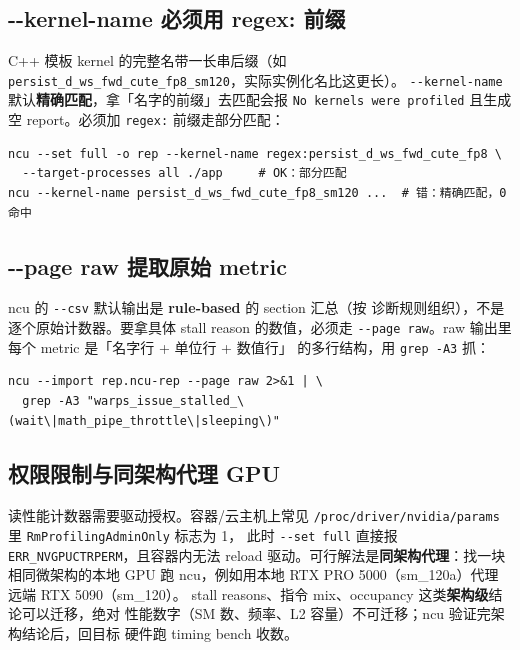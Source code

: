 \subsection{-{}-kernel-name 必须用 regex: 前缀}

C++ 模板 kernel 的完整名带一长串后缀（如
\texttt{persist\_\allowbreak{}d\_\allowbreak{}ws\_\allowbreak{}fwd\_\allowbreak{}cute\_\allowbreak{}fp8\_\allowbreak{}sm120}，实际实例化名比这更长）。
\texttt{-{}-kernel-name} 默认\textbf{精确匹配}，拿「名字的前缀」去匹配会报
\texttt{No kernels were profiled} 且生成空 report。必须加 \texttt{regex:}
前缀走部分匹配：

\begin{lstlisting}[style=console, title={kernel 名过滤：regex 前缀}]
ncu --set full -o rep --kernel-name regex:persist_d_ws_fwd_cute_fp8 \
  --target-processes all ./app     # OK：部分匹配
ncu --kernel-name persist_d_ws_fwd_cute_fp8_sm120 ...  # 错：精确匹配，0 命中
\end{lstlisting}

\subsection{-{}-page raw 提取原始 metric}

ncu 的 \texttt{-{}-csv} 默认输出是 \textbf{rule-based} 的 section 汇总（按
诊断规则组织），不是逐个原始计数器。要拿具体 stall reason 的数值，必须走
\texttt{-{}-page raw}。raw 输出里每个 metric 是「名字行 + 单位行 + 数值行」
的多行结构，用 \texttt{grep -A3} 抓：

\begin{lstlisting}[style=console, title={从 raw page 提取 stall 指标}]
ncu --import rep.ncu-rep --page raw 2>&1 | \
  grep -A3 "warps_issue_stalled_\(wait\|math_pipe_throttle\|sleeping\)"
\end{lstlisting}

\subsection{权限限制与同架构代理 GPU}

读性能计数器需要驱动授权。容器/云主机上常见
\texttt{/proc/\allowbreak{}driver/\allowbreak{}nvidia/\allowbreak{}params} 里
\texttt{Rm\allowbreak{}Profiling\allowbreak{}Admin\allowbreak{}Only} 标志为 1，
此时 \texttt{-{}-set full} 直接报 \texttt{ERR\_\allowbreak{}NVGPUCTRPERM}，且容器内无法
reload 驱动。可行解法是\textbf{同架构代理}：找一块相同微架构的本地 GPU 跑
ncu，例如用本地 RTX PRO 5000（sm\_120a）代理远端 RTX 5090（sm\_120）。
stall reasons、指令 mix、occupancy 这类\textbf{架构级}结论可以迁移，绝对
性能数字（SM 数、频率、L2 容量）不可迁移；ncu 验证完架构结论后，回目标
硬件跑 timing bench 收数。


